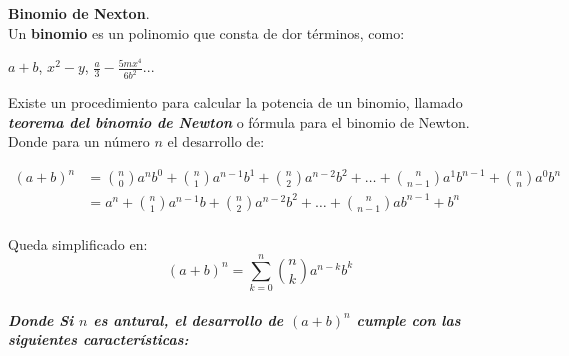 \noindent \textbf{Binomio de Nexton}.\\
    \noindent Un \textbf{binomio} es un polinomio que consta de dor t\'erminos, como: 
    \begin{center}
        $a+b$, $x^{2}-y$, $\frac{a}{3}-\frac{5mx^{4}}{6b^{2}}$...
    \end{center}
    
    \noindent Existe un procedimiento  para calcular la potencia de un binomio, llamado \textbf{\textit{teorema del binomio de Newton}} o fórmula para el binomio de Newton. Donde para un n\'umero $n$ el desarrollo de:

    \begin{align*}
(a + b)^n &= \binom{n}{0}a^n b^0 + \binom{n}{1}a^{n-1}b^1 + \binom{n}{2}a^{n-2}b^2 + \ldots + \binom{n}{n-1}a^1b^{n-1} + \binom{n}{n}a^0b^n \\
&= a^n + \binom{n}{1}a^{n-1}b + \binom{n}{2}a^{n-2}b^2 + \ldots + \binom{n}{n-1}ab^{n-1} + b^n
\end{align*}\\

    Queda simplificado en:
    \begin{equation}
        (a + b)^n = \sum_{k=0}^{n} \binom{n}{k} a^{n-k} b^k
    \end{equation}\\

\noindent \textit{\textbf{Donde Si $n$ es antural, el desarrollo de $(a+b)^{n}$ cumple con las siguientes caracter\'isticas:}}

